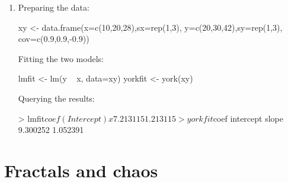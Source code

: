 \begin{enumerate}
Comparing with a numerical simulation:
  
\begin{script}
n <- 100
x <- rnorm(n,mean=100,sd=5)
y <- rnorm(n,mean=100,sd=1)
z <- rnorm(n,mean=100,sd=10)
X <- x/z
Y <- y/z
\end{script}

Then query the spurious correlation coefficient:

\begin{script}
> cor(X,Y)
[1] 0.891362
\end{script}

\item Preparing the data:

\begin{script}
xy <- data.frame(x=c(10,20,28),sx=rep(1,3),
                 y=c(20,30,42),sy=rep(1,3),
                 cov=c(0.9,0.9,-0.9))
\end{script}

Fitting the two models:

\begin{script}[firstnumber=4]
lmfit <- lm(y ~ x, data=xy)
yorkfit <- york(xy)
\end{script}

Querying the results:

\begin{console}
> lmfit$coef
(Intercept)           x 
   7.213115    1.213115 
> yorkfit$coef
intercept     slope 
 9.300252  1.052391 
\end{console}
  
\end{enumerate}

\section{Fractals and chaos}
\label{sec:sol-fractals}

